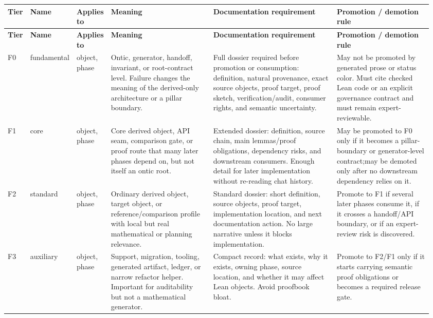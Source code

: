 \small
{}
\begin{longtable}{L{0.035\linewidth} L{0.06\linewidth} L{0.06\linewidth} L{0.255\linewidth} L{0.31\linewidth} L{0.24\linewidth}}
\hline
\textbf{Tier} & \textbf{Name} & \textbf{Applies to} & \textbf{Meaning} & \textbf{Documentation requirement} & \textbf{Promotion /\allowbreak{} demotion rule}\\
\hline
\endfirsthead
\hline
\textbf{Tier} & \textbf{Name} & \textbf{Applies to} & \textbf{Meaning} & \textbf{Documentation requirement} & \textbf{Promotion /\allowbreak{} demotion rule}\\
\hline
\endhead
F0 & fundamental & object, phase & Ontic, generator, handoff, invariant, or root-contract level. Failure changes the meaning of the derived-only architecture or a pillar boundary. & Full dossier required before promotion or consumption: definition, natural provenance, exact source objects, proof target, proof sketch, verification/\allowbreak{}audit, consumer rights, and semantic uncertainty. & May not be promoted by generated prose or status color. Must cite checked Lean code or an explicit governance contract and must remain expert-reviewable.\\
\hline
\addlinespace[0.24em]
F1 & core & object, phase & Core derived object, API seam, comparison gate, or proof route that many later phases depend on, but not itself an ontic root. & Extended dossier: definition, source chain, main lemmas/\allowbreak{}proof obligations, dependency risks, and downstream consumers. Enough detail for later implementation without re-reading chat history. & May be promoted to F0 only if it becomes a pillar-boundary or generator-level contract;\newline may be demoted only after no downstream dependency relies on it.\\
\hline
\addlinespace[0.24em]
F2 & standard & object, phase & Ordinary derived object, target object, or reference/\allowbreak{}comparison profile with local but real mathematical or planning relevance. & Standard dossier: short definition, source objects, proof target, implementation location, and next documentation action. No large narrative unless it blocks implementation. & Promote to F1 if several later phases consume it, if it crosses a handoff/\allowbreak{}API boundary, or if an expert-review risk is discovered.\\
\hline
\addlinespace[0.24em]
F3 & auxiliary & object, phase & Support, migration, tooling, generated artifact, ledger, or narrow refactor helper. Important for auditability but not a mathematical generator. & Compact record: what exists, why it exists, owning phase, source location, and whether it may affect Lean objects. Avoid proofbook bloat. & Promote to F2/\allowbreak{}F1 only if it starts carrying semantic proof obligations or becomes a required release gate.\\

\end{longtable}
